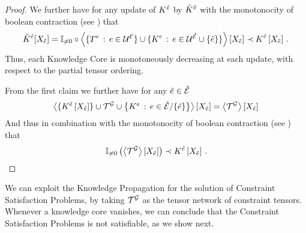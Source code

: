 \begin{proof}
	We further have for any update of $K^{\tilde{e}}$ by $\tilde{K}^{\tilde{e}}$ with the monotonocity of boolean contraction (see ) that
	\begin{align*}
		\tilde{K}^{\tilde{e}}[X_{\tilde{e}}]
		= \mathbb{I}_{\neq0}\circ\left\langle 
			\{T^{e} \, : \, e\in\mathcal{U}^{\mathcal{E}}\} \cup \{K^{e} \, : \, e\in\mathcal{U}^{\tilde{\mathcal{E}}}\cup\{\tilde{e}\}\}
		\right\rangle \left[ X_{\tilde{e}} \right]
		\prec K^{\tilde{e}}\left[X_{\tilde{e}}\right] \, .
	\end{align*}
	Thus, each Knowledge Core is monotoneously decreasing at each update, with respect to the partial tensor ordering.

	From the first claim we further have for any $\tilde{e}\in\tilde{\mathcal{E}}$
	\begin{align*}
		\left\langle \{K^{\tilde{e}}\left[X_{\tilde{e}}\right]\}\cup\mathcal{T}^{\mathcal{G}} \cup \left\{K^{e} \, : \, e\in\tilde{\mathcal{E}}/\{\tilde{e}\}\right\}\right\rangle \left[ X_{\tilde{e}} \right]
		= \left\langle \mathcal{T}^{\mathcal{G}}\right\rangle \left[ X_{\tilde{e}} \right]
	\end{align*}
	And thus in combination with the monotonocity of boolean contraction (see ) that
	\begin{align*}
		\mathbb{I}_{\neq0}\left(\left\langle \mathcal{T}^{\mathcal{G}}\right\rangle \left[ X_{\tilde{e}} \right]\right) \prec K^{\tilde{e}}\left[X_{\tilde{e}}\right]  \, .
	\end{align*}
\end{proof}

We can exploit the Knowledge Propagation  for the solution of Constraint Satisfaction Problems, by taking $\mathcal{T}^{\mathcal{G}}$ as the tensor network of constraint tensors.
Whenever a knowledge core vanishes, we can conclude that the Constraint Satisfaction Problems is not satisfiable, as we show next.

